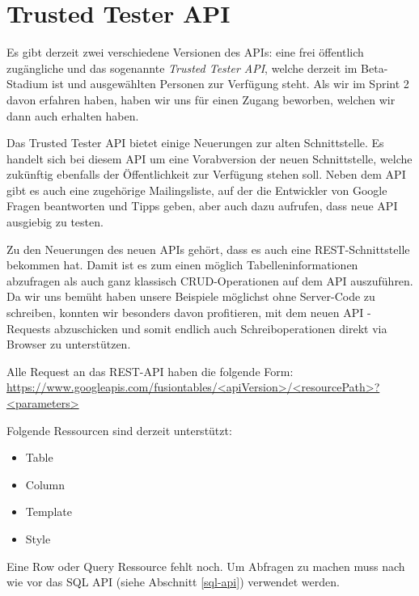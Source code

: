 \section{Trusted Tester API}
\label{trusted-tester-api}
Es gibt derzeit zwei verschiedene Versionen des APIs: eine frei öffentlich zugängliche und das sogenannte \emph{Trusted Tester API}, welche derzeit im Beta-Stadium ist und ausgewählten Personen zur Verfügung steht. Als wir im Sprint 2 davon erfahren haben, haben wir uns für einen Zugang beworben, welchen wir dann auch erhalten haben.

Das Trusted Tester API bietet einige Neuerungen zur alten Schnittstelle. Es handelt sich bei diesem API um eine Vorabversion der neuen Schnittstelle, welche zukünftig ebenfalls der Öffentlichkeit zur Verfügung stehen soll. Neben dem API gibt es auch eine zugehörige Mailingsliste, auf der die Entwickler von Google Fragen beantworten und Tipps geben, aber auch dazu aufrufen, dass neue API ausgiebig zu testen.

Zu den Neuerungen des neuen APIs gehört, dass es auch eine \gls{REST}-Schnittstelle bekommen hat. Damit ist es zum einen möglich Tabelleninformationen abzufragen als auch ganz klassisch CRUD-Operationen auf dem API auszuführen. Da wir uns bemüht haben unsere Beispiele möglichst ohne Server-Code zu schreiben, konnten wir besonders davon profitieren, mit dem neuen API -Requests abzuschicken und somit endlich auch Schreiboperationen direkt via Browser zu unterstützen.

Alle Request an das \gls{REST}-API haben die folgende Form: \\
\url{https://www.googleapis.com/fusiontables/<apiVersion>/<resourcePath>?<parameters>}

Folgende Ressourcen sind derzeit unterstützt:
\begin{itemize}
	\item Table
	\item Column
	\item Template
	\item Style
\end{itemize}

Eine Row oder Query Ressource fehlt noch. Um Abfragen zu machen muss nach wie vor das SQL API (siehe Abschnitt \ref{sql-api}) verwendet werden.

